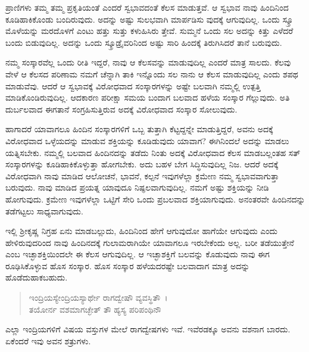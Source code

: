 ಪ್ರಾಣಿಗಳು ತಮ್ಮ ತಮ್ಮ ಪ್ರಕೃತಿಯಂತೆ ಎಂದರೆ ಸ್ವಭಾವದಂತೆ ಕೆಲಸ ಮಾಡುತ್ತವೆ. ಆ ಸ್ವಭಾವ ನಾವು ಹಿಂದಿನಿಂದ ಕೂಡಿಹಾಕಿಕೊಂಡು ಬಂದಿರುವುದು. ಅದನ್ನು ಅಷ್ಟು ಸುಲಭವಾಗಿ ಮಾರ್ಪಡಿಸು ವುದಕ್ಕೆ ಆಗುವುದಿಲ್ಲ. ಒಂದು ಸ್ಕ್ರೂ ಮೊಳೆಯನ್ನು ಮರದೊಳಗೆ ಎಂಟು ಹತ್ತು ಸುತ್ತು ಕಳುಹಿಸಿರು ತ್ತೇವೆ. ಸುಮ್ಮನೆ ಒಂದು ಸಲ ಅದನ್ನು ಕಿತ್ತು ಎಳೆದರೆ ಬಂದು ಬಿಡುವುದಿಲ್ಲ. ಅದನ್ನು ಒಂದು ಸ್ಕ್ರೂಡ್ರೈವರಿನಿಂದ ಅಷ್ಟು ಸಾರಿ ಹಿಂದಕ್ಕೆ ತಿರುಗಿಸಿದರೆ ತಾನೆ ಬರುವುದು.

ನಮ್ಮ ಸಂಸ್ಕಾರವೆಲ್ಲ ಒಂದು ರೀತಿ ಇದ್ದರೆ, ನಾವು ಆ ಕೆಲಸವನ್ನು ಮಾಡುವುದಿಲ್ಲ ಎಂದರೆ ಮಾತ್ರ ಸಾಲದು. ಕೆಲವು ವೇಳೆ ಆ ಕೆಲಸದ ಪರಿಣಾಮ ನಮಗೆ ಚೆನ್ನಾಗಿ ತಾಕಿ ಇನ್ನೊಂದು ಸಲ ನಾನು ಆ ಕೆಲಸ ಮಾಡುವುದಿಲ್ಲ ಎಂದು ಶಪಥ ಮಾಡುವೆವು. ಆದರೆ ಆ ಸ್ವಭಾವಕ್ಕೆ ವಿರೋಧವಾದ ಸಂಸ್ಕಾರಗಳನ್ನು ಅಷ್ಟೇ ಬಲವಾಗಿ ನಮ್ಮಲ್ಲಿ ಉತ್ಪತ್ತಿ ಮಾಡಿಕೊಂಡಿರುವುದಿಲ್ಲ. ಆದಕಾರಣ ಪರೀಕ್ಷಾ ಸಮಯ ಬಂದಾಗ ಬಲವಾದ ಹಳೆಯ ಸಂಸ್ಕಾರ ಗೆಲ್ಲುವುದು. ಅತಿ ದುರ್ಬಲವಾದ ಈಗತಾನೆ ಸಂಗ್ರಹಿಸುತ್ತಿರುವ ಅದಕ್ಕೆ ವಿರೋಧವಾದ ಸಂಸ್ಕಾರ ಸೋಲುವುದು.

ಹಾಗಾದರೆ ಯಾವಾಗಲೂ ಹಿಂದಿನ ಸಂಸ್ಕಾರಗಳಿಗೆ ಒಬ್ಬ ತುತ್ತಾಗಿ ಕೆಟ್ಟದ್ದನ್ನೇ ಮಾಡುತ್ತಿದ್ದರೆ, ಅವನು ಅದಕ್ಕೆ ವಿರೋಧವಾದ ಒಳ್ಳೆಯದನ್ನು ಮಾಡುವ ಶಕ್ತಿಯನ್ನು ಕೂಡಿಡುವುದು ಯಾವಾಗ? ಈಗಿನಿಂದಲೆ ಅದನ್ನು ಮಾಡಲು ಯತ್ನಿಸಬೇಕು. ನಮ್ಮಲ್ಲಿ ಬಲವಾದ ಹಿಂದಿನದನ್ನು ತಡೆದು ನಿಂತು ಅದಕ್ಕೆ ವಿರೋಧವಾದ ಕೆಲಸ ಮಾಡಬಲ್ಲಂತಹ ಸತ್ ಸಂಸ್ಕಾರಗಳನ್ನು ಕೂಡಿಹಾಕಿಕೊಳ್ಳುತ್ತಾ ಹೋಗಬೇಕು. ಅದು ಬಹಳ ಬೇಗ ಸಿದ್ಧಿಸುವುದಿಲ್ಲ ನಿಜ. ಆದರೆ ಅದಕ್ಕೆ ವಿರೋಧವಾಗಿ ನಾವು ಮಾಡಿದ ಆಲೋಚನೆ, ಭಾವನೆ, ಕಲ್ಪನೆ ಇವುಗಳೆಲ್ಲಾ ಕ್ರಮೇಣ ನಮ್ಮ ಸ್ವಭಾವವಾಗುತ್ತಾ ಬರುವುದು. ನಾವು ಮಾಡಿದ ಪ್ರಯತ್ನ ಯಾವುದೂ ನಿಷ್ಫಲವಾಗುವುದಿಲ್ಲ. ನಮಗೆ ಅಷ್ಟು ಶಕ್ತಿಯನ್ನು ನೀಡಿ ಹೋಗುವುದು. ಕ್ರಮೇಣ ಇವುಗಳೆಲ್ಲಾ ಒಟ್ಟಿಗೆ ಸೇರಿ ಒಂದು ಪ್ರಬಲವಾದ ಶಕ್ತಿಯಾಗುವುದು. ಅನಂತರವೇ ಹಿಂದಿನದನ್ನು ತಡೆಗಟ್ಟಲು ಸಾಧ್ಯವಾಗುವುದು.

ಇಲ್ಲಿ ಶ‍್ರೀಕೃಷ್ಣ ನಿಗ್ರಹ ಏನು ಮಾಡಬಲ್ಲುದು, ಹಿಂದಿನಿಂದ ಹೇಗೆ ಆಗುವುದೋ ಹಾಗೆಯೇ ಆಗುವುದು ಎಂದು ಹೇಳಿರುವುದರಿಂದ ನಾವು ಹಿಂದಿನದಕ್ಕೆ ಗುಲಾಮರಾಗಿಯೇ ಯಾವಾಗಲೂ ಇರಬೇಕೆಂದು ಅಲ್ಲ. ಬರೀ ತಡೆಯುತ್ತೇನೆ ಎಂಬ ಇಚ್ಛಾಶಕ್ತಿಯಿಂದಲೇ ಈ ಕೆಲಸ ಆಗುವುದಿಲ್ಲ. ಆ ಇಚ್ಛಾಶಕ್ತಿಗೆ ಬಲವನ್ನು ಕೊಡುವುದು ನಾವು ಈಗ ರೂಢಿಸಿಕೊಳ್ಳುವ ಹೊಸ ಸಂಸ್ಕಾರ. ಹೊಸ ಸಂಸ್ಕಾರ ಹಳೆಯದರಷ್ಟೇ ಬಲವಾದಾಗ ಮಾತ್ರ ಅದನ್ನು ಹೊಡೆದುಹಾಕಬಹುದು.

\begin{verse}
ಇಂದ್ರಿಯಸ್ಯೇಂದ್ರಿಯಸ್ಯಾರ್ಥೇ ರಾಗದ್ವೇಷೌ ವ್ಯವಸ್ಥಿತೌ~।\\ತಯೋರ್ನ ವಶಮಾಗಚ್ಛೇತ್ ತೌ ಹ್ಯಸ್ಯ ಪರಿಪಂಥಿನೌ 
\end{verse}

{\small ಎಲ್ಲಾ ಇಂದ್ರಿಯಗಳಿಗೆ ವಿಷಯ ವಸ್ತುಗಳ ಮೇಲೆ ರಾಗದ್ವೇಷಗಳು ಇವೆ. ಇವೆರಡಕ್ಕೂ ಅವನು ವಶನಾಗ ಬಾರದು. ಏಕೆಂದರೆ ಇವು ಅವನ ಶತ್ರುಗಳು.}


